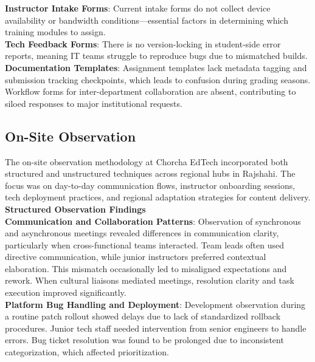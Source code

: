 \documentclass[12pt,a4paper,oneside]{book}
\begin{document}
\textbf{Instructor Intake Forms}: Current intake forms do not collect device availability or bandwidth conditions—essential factors in determining which training modules to assign.\\

\textbf{Tech Feedback Forms}: There is no version-locking in student-side error reports, meaning IT teams struggle to reproduce bugs due to mismatched builds.\\

\textbf{Documentation Templates}: Assignment templates lack metadata tagging and submission tracking checkpoints, which leads to confusion during grading seasons. Workflow forms for inter-department collaboration are absent, contributing to siloed responses to major institutional requests.\\


\subsection{On-Site Observation}

The on-site observation methodology at Chorcha EdTech incorporated both structured and unstructured techniques across regional hubs in Rajshahi. The focus was on day-to-day communication flows, instructor onboarding sessions, tech deployment practices, and regional adaptation strategies for content delivery.\\

\textbf{Structured Observation Findings} \\

\textbf{Communication and Collaboration Patterns}: Observation of synchronous and asynchronous meetings revealed differences in communication clarity, particularly when cross-functional teams interacted. Team leads often used directive communication, while junior instructors preferred contextual elaboration. This mismatch occasionally led to misaligned expectations and rework. When cultural liaisons mediated meetings, resolution clarity and task execution improved significantly.\\

\textbf{Platform Bug Handling and Deployment}: Development observation during a routine patch rollout showed delays due to lack of standardized rollback procedures. Junior tech staff needed intervention from senior engineers to handle errors. Bug ticket resolution was found to be prolonged due to inconsistent categorization, which affected prioritization.\\
\end{document}
